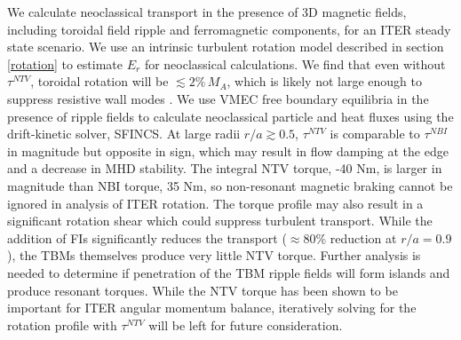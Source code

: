 \documentclass{article}
\numberwithin{figure}{section}
\numberwithin{equation}{section}
\begin{document}
We calculate neoclassical transport in the presence of 3D magnetic fields, including toroidal field ripple and ferromagnetic components, for an ITER steady state scenario. We use an intrinsic turbulent rotation model described in section \ref{rotation} to estimate $E_r$ for neoclassical calculations. We find that even without $\tau^{NTV}$, toroidal rotation will be $\lesssim 2\% \,M_A$, which is likely not large enough to suppress resistive wall modes \cite{Liu2004}. We use VMEC free boundary equilibria in the presence of ripple fields to calculate neoclassical particle and heat fluxes using the drift-kinetic solver, SFINCS. At large radii $r/a \gtrsim 0.5$, $\tau^{NTV}$ is comparable to $\tau^{NBI}$ in magnitude but opposite in sign, which may result in flow damping at the edge and a decrease in MHD stability. The integral NTV torque, -40 Nm, is larger in magnitude than NBI torque, 35 Nm, so non-resonant magnetic braking cannot be ignored in analysis of ITER rotation. The torque profile may also result in a significant rotation shear which could suppress turbulent transport. While the addition of FIs significantly reduces the transport ($\approx 80\%$ reduction at $r/a = 0.9$), the TBMs themselves produce very little NTV torque. Further analysis is needed to determine if penetration of the TBM ripple fields will form islands and produce resonant torques. While the NTV torque has been shown to be important for ITER angular momentum balance, iteratively solving for the rotation profile with $\tau^{NTV}$ will be left for future consideration.

\appendix
\end{document}
